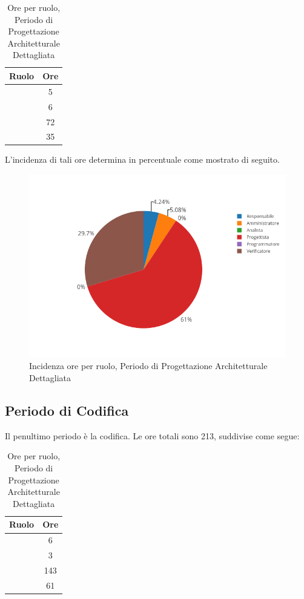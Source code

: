 \begin{table}[H]
	\begin{center}
		\begin{tabular}{|c|c|}
			\hline
			\textbf{Ruolo}	& \textbf{Ore} \\
			\hline
			\Res	&	5	\\
			\hline
			\Amm	&	6	\\
			\hline
			\Prog   &	72	\\
			\hline
			\Ver	&	35	\\
			\hline
		\end{tabular}
	\end{center}
	\caption{Ore per ruolo, Periodo di Progettazione Architetturale Dettagliata}
\end{table}

L'incidenza di tali ore determina in percentuale come mostrato di seguito.
\begin{figure}[H]
	\centering
	\includegraphics[scale=0.6]{img/ProgettazioneDettaglio.png}
	\caption{Incidenza ore per ruolo, Periodo di Progettazione Architetturale Dettagliata}
\end{figure}

\subsection{Periodo di Codifica}
Il penultimo periodo è la codifica. Le ore totali sono 213, suddivise come segue:

\begin{table}[H]
	\begin{center}
		\begin{tabular}{|c|c|}
			\hline
			\textbf{Ruolo}	& \textbf{Ore} \\
			\hline
			\Res	&	6	\\
			\hline
			\Amm	&	3	\\
			\hline
			\Progr   &	143	\\
			\hline
			\Ver	&	61	\\
			\hline
		\end{tabular}
	\end{center}
	\caption{Ore per ruolo, Periodo di Progettazione Architetturale Dettagliata}
\end{table}

